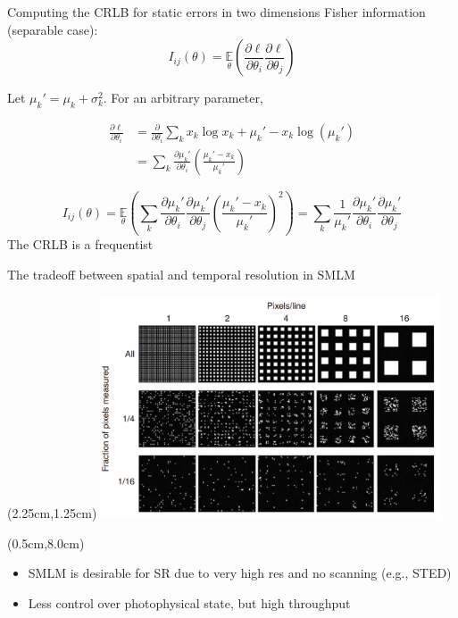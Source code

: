 \documentclass{beamer}					%
\begin{document}
\begin{frame}{Computing the CRLB for static errors in two dimensions}
Fisher information (separable case): \begin{equation}
I_{ij}(\theta) = \underset{\theta}{\mathbb{E}}\left(\frac{\partial \ell}{\partial\theta_{i}}\frac{\partial\ell}{\partial\theta_{j}}\right) 
\end{equation}

Let $\mu_{k}' = \mu_{k} + \sigma_{k}^{2}$. For an arbitrary parameter,

\begin{align*}
\frac{\partial \ell}{\partial \theta_{i}} &= \frac{\partial}{\partial \theta_{i}} \sum_{k}  x_{k}\log x_{k} + \mu_{k}' - x_{k}\log\left(\mu_{k}'\right)\\
&= \sum_{k} \frac{\partial \mu_{k}'}{\partial\theta_{i}} \left(\frac{\mu_{k}'-x_{k}}{\mu_{k}'}\right)
\end{align*}

\begin{equation*}
I_{ij}(\theta) = \underset{\theta}{\mathbb{E}}\left(\sum_{k}\frac{\partial \mu_{k}'}{\partial\theta_{i}}\frac{\partial \mu_{k}'}{\partial\theta_{j}} \left(\frac{\mu_{k}'-x_{k}}{\mu_{k}'}\right)^{2}\right) = \sum_{k}\frac{1}{\mu_{k}'}\frac{\partial \mu_{k}'}{\partial\theta_{i}}\frac{\partial \mu_{k}'}{\partial\theta_{j}}
\end{equation*}
The CRLB is a frequentist 
\end{frame}


\begin{frame}{The tradeoff between spatial and temporal resolution in SMLM}
\begin{textblock*}{10cm}(2.25cm,1.25cm)
\includegraphics[width=10cm]{Shroff.png}
\end{textblock*}
\begin{textblock*}{\textwidth}(0.5cm,8.0cm)
\begin{itemize}
\item SMLM is desirable for SR due to very high res and no scanning (e.g., STED)
\item Less control over photophysical state, but high throughput
\end{itemize}
\end{textblock*}
\end{frame}
\end{document}
